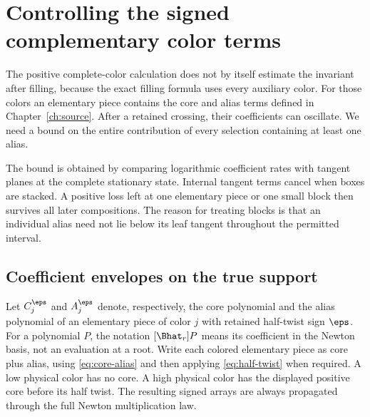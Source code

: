 \chapter{Controlling the signed complementary color terms}\label{ch:alias}

The positive complete-color calculation does not by itself estimate the invariant after filling, because the exact filling formula uses every auxiliary color. For those colors an elementary piece contains the core and alias terms defined in Chapter~\ref{ch:source}. After a retained crossing, their coefficients can oscillate. We need a bound on the entire contribution of every selection containing at least one alias.

The bound is obtained by comparing logarithmic coefficient rates with tangent planes at the complete stationary state. Internal tangent terms cancel when boxes are stacked. A positive loss left at one elementary piece or one small block then survives all later compositions. The reason for treating blocks is that an individual alias need not lie below its leaf tangent throughout the permitted interval.

\section{Coefficient envelopes on the true support}
Let $C_j^\eps$ and $A_j^\eps$ denote, respectively, the core polynomial and the alias polynomial of an elementary piece of color $j$ with retained half-twist sign $\eps$. For a polynomial $P$, the notation $[\Bhat_r]P$ means its coefficient in the Newton basis, not an evaluation at a root. Write each colored elementary piece as core plus alias, using \eqref{eq:core-alias} and then applying \eqref{eq:half-twist} when required. A low physical color has no core. A high physical color has the displayed positive core before its half twist. The resulting signed arrays are always propagated through the full Newton multiplication law.

